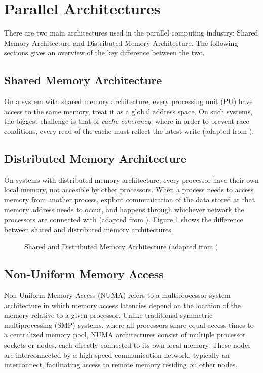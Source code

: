 \section{Parallel Architectures}
There are two main architectures used in the parallel computing industry: Shared Memory Architecture and Distributed Memory Architecture. The following sections gives an overview of the key difference between the two.

\subsection{Shared Memory Architecture}
On a system with shared memory architecture, every processing unit (PU) have access to the same memory, treat it as a global address space. On such systems, the biggest challenge is that of \textit{cache coherency}, where in order to prevent race conditions, every read of the cache must reflect the latest write (adapted from \cite{manchanda2010non}). 

\subsection{Distributed Memory Architecture}
On systems with distributed memory architecture, every processor have their own local memory, not accesible by other processors. When a process needs to access memory from another process, explicit communication of the data stored at that memory address needs to occur, and happens through whichever network the processors are connected with (adapted from \cite{manchanda2010non}). Figure \ref{fig:sharedmemory} shows the difference between shared and distributed memory architectures.

\begin{figure}[ht]
    \centering
    \caption{Shared and Distributed Memory Architecture (adapted from \cite{llnlparallel})}
    \label{fig:sharedmemory}
\end{figure}

\subsection{Non-Uniform Memory Access}
Non-Uniform Memory Access (NUMA) refers to a multiprocessor system architecture in which memory access latencies depend on the location of the memory relative to a given processor. Unlike traditional symmetric multiprocessing (SMP) systems, where all processors share equal access times to a centralized memory pool, NUMA architectures consist of multiple processor sockets or nodes, each directly connected to its own local memory. These nodes are interconnected by a high-speed communication network, typically an interconnect, facilitating access to remote memory residing on other nodes.

